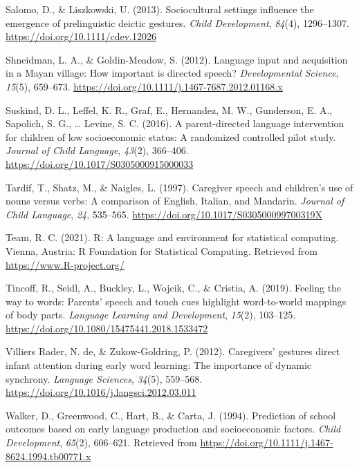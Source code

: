 \documentclass[
  english,
  man,mask]{apa6}
\begin{document}
\leavevmode\hypertarget{ref-salomo_sociocultural_2013}{}%
Salomo, D., \& Liszkowski, U. (2013). Sociocultural settings influence the emergence of prelinguistic deictic gestures. \emph{Child Development}, \emph{84}(4), 1296--1307. \url{https://doi.org/10.1111/cdev.12026}

\leavevmode\hypertarget{ref-shneidman_language_2012}{}%
Shneidman, L. A., \& Goldin-Meadow, S. (2012). Language input and acquisition in a Mayan village: How important is directed speech? \emph{Developmental Science}, \emph{15}(5), 659--673. \url{https://doi.org/10.1111/j.1467-7687.2012.01168.x}

\leavevmode\hypertarget{ref-suskind_parent-directed_2016}{}%
Suskind, D. L., Leffel, K. R., Graf, E., Hernandez, M. W., Gunderson, E. A., Sapolich, S. G., \ldots{} Levine, S. C. (2016). A parent-directed language intervention for children of low socioeconomic status: A randomized controlled pilot study. \emph{Journal of Child Language}, \emph{43}(2), 366--406. \url{https://doi.org/10.1017/S0305000915000033}

\leavevmode\hypertarget{ref-tardif_caregiver_1997}{}%
Tardif, T., Shatz, M., \& Naigles, L. (1997). Caregiver speech and children's use of nouns versus verbs: A comparison of English, Italian, and Mandarin. \emph{Journal of Child Language}, \emph{24}, 535--565. \url{https://doi.org/10.1017/S030500099700319X}

\leavevmode\hypertarget{ref-r_core_team_r_2021}{}%
Team, R. C. (2021). R: A language and environment for statistical computing. Vienna, Austria: R Foundation for Statistical Computing. Retrieved from \url{https://www.R-project.org/}

\leavevmode\hypertarget{ref-tincoff_feeling_2019}{}%
Tincoff, R., Seidl, A., Buckley, L., Wojcik, C., \& Cristia, A. (2019). Feeling the way to words: Parents' speech and touch cues highlight word-to-world mappings of body parts. \emph{Language Learning and Development}, \emph{15}(2), 103--125. \url{https://doi.org/10.1080/15475441.2018.1533472}

\leavevmode\hypertarget{ref-de_villiers_rader_caregivers_2012}{}%
Villiers Rader, N. de, \& Zukow-Goldring, P. (2012). Caregivers' gestures direct infant attention during early word learning: The importance of dynamic synchrony. \emph{Language Sciences}, \emph{34}(5), 559--568. \url{https://doi.org/10.1016/j.langsci.2012.03.011}

\leavevmode\hypertarget{ref-walker_prediction_1994}{}%
Walker, D., Greenwood, C., Hart, B., \& Carta, J. (1994). Prediction of school outcomes based on early language production and socioeconomic factors. \emph{Child Development}, \emph{65}(2), 606--621. Retrieved from \url{https://doi.org/10.1111/j.1467-8624.1994.tb00771.x}
\end{document}
